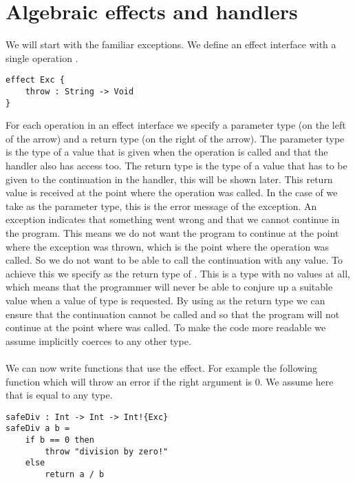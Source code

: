 \section{Algebraic effects and handlers}
\label{sec:background-algeff}
We will start with the familiar exceptions. We define an  effect interface with a single operation .

\begin{verbatim}
effect Exc {
	throw : String -> Void
}
\end{verbatim}

For each operation in an effect interface we specify a parameter type (on the left of the arrow) and a return type (on the right of the arrow).
The parameter type is the type of a value that is given when the operation is called and that the handler also has access too.
The return type is the type of a value that has to be given to the continuation in the handler, this will be shown later.
This return value is received at the point where the operation was called.
In the case of  we take  as the parameter type, this is the error message of the exception.
An exception indicates that something went wrong and that we cannot continue in the program.
This means we do not want the program to continue at the point where the exception was thrown, which is the point where the  operation was called.
So we do not want to be able to call the continuation with any value.
To achieve this we specify  as the return type of .
This is a type with no values at all, which means that the programmer will never be able to conjure up a suitable value when a value of type  is requested. By using  as the return type we can ensure that the continuation cannot be called and so that the program will not continue at the point where  was called. To make the code more readable we assume  implicitly coerces to any other type.
\\\\
We can now write functions that use the  effect.
For example the following function  which will throw an error if the right argument is $0$.
We assume here that  is equal to any type.

\begin{verbatim}
safeDiv : Int -> Int -> Int!{Exc}
safeDiv a b =
	if b == 0 then
		throw "division by zero!"
	else
		return a / b
\end{verbatim}

